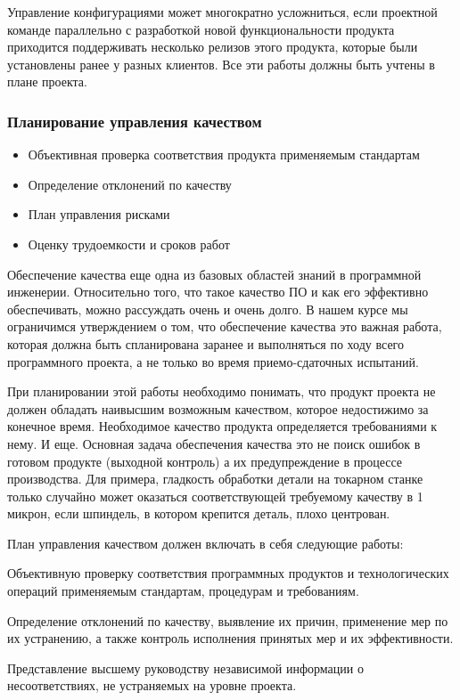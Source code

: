 \documentclass{../industrial-development}
\begin{document}
Управление конфигурациями может многократно усложниться, если проектной команде параллельно с разработкой новой функциональности продукта приходится поддерживать несколько релизов этого продукта, которые были установлены ранее у разных клиентов. Все эти работы должны быть учтены в плане проекта.

    \begin{frame} \frametitle{Планирование управления качеством}
        \begin{itemize}
            \item Объективная проверка соответствия продукта применяемым стандартам
            \item Определение отклонений по качеству
            \item План управления рисками
            \item Оценку трудоемкости и сроков работ
        \end{itemize}
    \end{frame}
    \lecturenotes
Обеспечение качества еще одна из базовых областей знаний в программной инженерии. Относительно того, что такое качество ПО и как его эффективно обеспечивать, можно рассуждать очень и очень долго. В нашем курсе мы ограничимся утверждением о том, что обеспечение качества это важная работа, которая должна быть спланирована заранее и выполняться по ходу всего программного проекта, а не только во время приемо-сдаточных испытаний.

При планировании этой работы необходимо понимать, что продукт проекта не должен обладать наивысшим возможным качеством, которое недостижимо за конечное время. Необходимое качество продукта определяется требованиями к нему. И еще. Основная задача обеспечения качества это не поиск ошибок в готовом продукте (выходной контроль) а их предупреждение в процессе производства. Для примера, гладкость обработки детали на токарном станке только случайно может оказаться соответствующей требуемому качеству в 1 микрон, если шпиндель, в котором крепится деталь, плохо центрован.

План управления качеством должен включать в себя следующие работы:

Объективную проверку соответствия программных продуктов и технологических операций применяемым стандартам, процедурам и требованиям.

Определение отклонений по качеству, выявление их причин, применение мер по их устранению, а также контроль исполнения принятых мер и их эффективности.

Представление высшему руководству независимой информации о несоответствиях, не устраняемых на уровне проекта.
\end{document}
